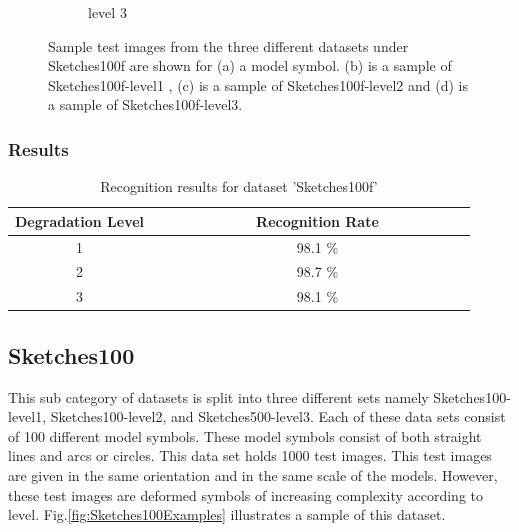 \begin{figure}[h]
\begin{subfigure}[b]{0.25\textwidth}
                \caption{level 3}
        \end{subfigure}
        \caption[Sample data from 'Sketches100f' dataset]{Sample test images from the three different datasets under Sketches100f are shown for (a) a model symbol. (b) is a sample of Sketches100f-level1 , (c)  is a sample of Sketches100f-level2 and (d) is a sample of Sketches100f-level3.}
        \label{fig:Sketches100fExamples}
\end{figure}

\subsubsection{Results}
\begin{table}[H]
\centering
\caption{Recognition results for dataset 'Sketches100f'}
\begin{tabular}{ccccccccccccccc}
  \hline
      Degradation Level & & & & & & & & Recognition Rate \\
  \hline
     1 & & & & & & & &  98.1 \% \\
     2 & & & & & & & &  98.7 \% \\
     3 & & & & & & & &  98.1 \% \\

  \hline
\end{tabular}
\end{table}

\vspace{49.3mm}

\subsection{Sketches100}
This sub category of datasets is split into three different sets namely Sketches100-level1, Sketches100-level2, and Sketches500-level3. Each of these data sets consist of 100 different model symbols. These model symbols consist of both straight lines and arcs or circles. This data set holds 1000 test images. This test images are given in the same orientation and in the same scale of the models. However, these test images are deformed symbols of increasing complexity according to level. Fig.\ref{fig:Sketches100Examples} illustrates a sample of this dataset.

